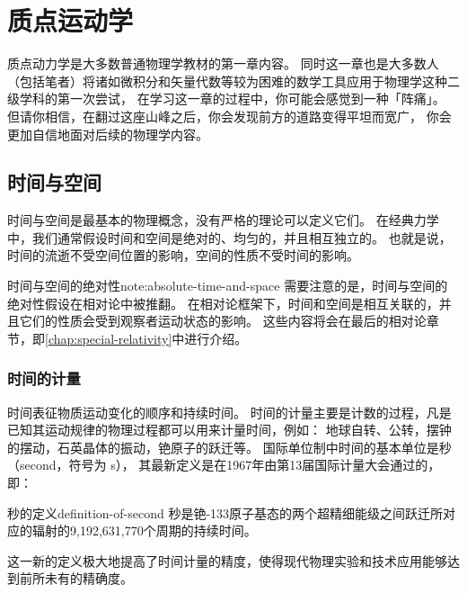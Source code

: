 \chapter{质点运动学}\label{chap:particle-kinematics}

\begin{intro}
    质点动力学是大多数普通物理学教材的第一章内容。
    同时这一章也是大多数人（包括笔者）将诸如微积分和矢量代数等较为困难的数学工具应用于物理学这种二级学科的第一次尝试，
    在学习这一章的过程中，你可能会感觉到一种「阵痛」。
    但请你相信，在翻过这座山峰之后，你会发现前方的道路变得平坦而宽广，
    你会更加自信地面对后续的物理学内容。
\end{intro}

\section{时间与空间}\label{sec:time-and-space}

时间与空间是最基本的物理概念，没有严格的理论可以定义它们。
在经典力学中，我们通常假设时间和空间是绝对的、均匀的，并且相互独立的。
也就是说，时间的流逝不受空间位置的影响，空间的性质不受时间的影响。

\begin{note}{时间与空间的绝对性}{note:absolute-time-and-space}
    需要注意的是，时间与空间的绝对性假设在相对论中被推翻。
    在相对论框架下，时间和空间是相互关联的，并且它们的性质会受到观察者运动状态的影响。
    这些内容将会在最后的相对论章节，即\cref{chap:special-relativity}中进行介绍。
\end{note}

\subsection{时间的计量}\label{subsec:time-measurement}

时间表征物质运动变化的顺序和持续时间。
时间的计量主要是计数的过程，凡是已知其运动规律的物理过程都可以用来计量时间，例如：
地球自转、公转，摆钟的摆动，石英晶体的振动，铯原子的跃迁等。
国际单位制中时间的基本单位是秒（second，符号为 s），
其最新定义是在1967年由第13届国际计量大会通过的，即：
\begin{definition}{秒的定义}{definition-of-second}
    秒是铯-133原子基态的两个超精细能级之间跃迁所对应的辐射的9,192,631,770个周期的持续时间。
\end{definition}
这一新的定义极大地提高了时间计量的精度，使得现代物理实验和技术应用能够达到前所未有的精确度。

